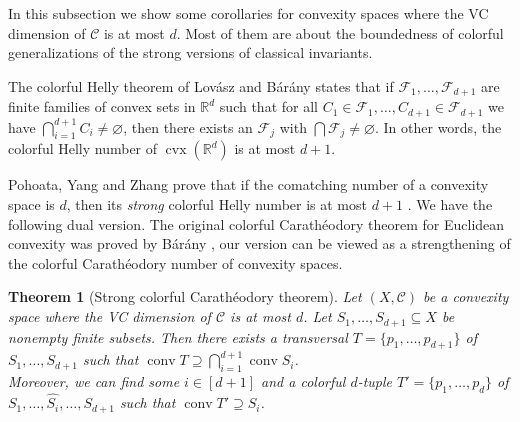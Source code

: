 \documentclass[11pt]{article}
\newtheorem{thm}{Theorem}[section]%
\theoremstyle{definition}
\newcommand{\F}{\mathcal{F}}
\newcommand{\C}{\mathcal{C}}
\newcommand{\conv}{\operatorname{conv}}
\newcommand{\cvx}{\operatorname{cvx}}
\renewcommand{\Re}{\mathbb{R}}
\begin{document}
In this subsection we show some corollaries for convexity spaces where the VC dimension of $\C$ is at most $d$. Most of them are about the boundedness of colorful generalizations of the strong versions of classical invariants.

The colorful Helly theorem of Lov\'asz and B\'ar\'any \cite{barany1982generalization} states that if $\F_1, \ldots, \F_{d+1}$ are finite families of convex sets in $\Re^d$ such that for all $C_1 \in \F_1, \ldots, C_{d+1} \in \F_{d+1}$ we have $\bigcap_{i=1}^{d+1}C_i \neq \varnothing$, then there exists an $\F_j$ with $\bigcap \F_j \neq \varnothing$.
In other words, the colorful Helly number of $\cvx(\Re^d)$ is at most $d+1$.

Pohoata, Yang and Zhang prove that if the comatching number of a convexity space is $d$, then its \emph{strong} colorful Helly number is at most $d+1$ \cite{pohoata2025colorful}.
We have the following dual version. The original colorful Carath\'eodory theorem for Euclidean convexity was proved by B\'ar\'any \cite{barany1982generalization}, our version can be viewed as a strengthening of the colorful Carath\'eodory number of convexity spaces.

\begin{thm}[Strong colorful Carath\'eodory theorem]\label{t:strongcolorfulCaratheodory}
    Let $(X,\C)$ be a convexity space where the VC dimension of $\C$ is at most $d$. Let $S_1, \ldots, S_{d+1} \subseteq X$ be nonempty finite subsets.
    Then there exists a transversal $T = \{p_1, \ldots, p_{d+1}\}$ of $S_1, \ldots, S_{d+1}$ such that $\conv T \supseteq \bigcap_{i=1}^{d+1} \conv S_i$.\\
    Moreover, we can find some $i \in [d+1]$ and a colorful $d$-tuple $T' = \{p_1, \ldots, p_d\}$ of $S_1, \ldots, \hat{S_i}, \ldots, S_{d+1}$ such that $\conv T' \supseteq S_i$.
\end{thm}
\end{document}
